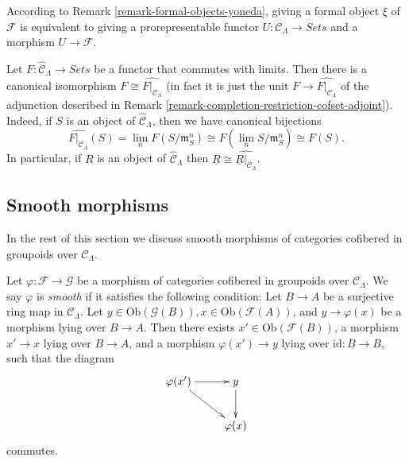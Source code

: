 \begin{remark}
\label{remark-spell-out-formal-object}
According to Remark \ref{remark-formal-objects-yoneda}, giving a formal object 
$\xi$ of $\mathcal{F}$ is equivalent to giving a prorepresentable functor $U: 
\mathcal{C}_\Lambda \to \textit{Sets}$ and a morphism $U 
\to \mathcal{F}$. 
\end{remark}

\begin{remark}
\label{remark-restrict-complete-continuous-functor}
Let $F : \widehat{\mathcal{C}}_\Lambda \to \textit{Sets}$ be a 
functor that commutes with limits.  Then there is a canonical isomorphism $F 
\cong \widehat{F|_{\mathcal{C}_\Lambda}}$ (in fact it is just the unit $F 
\to \widehat{F|_{\mathcal{C}_\Lambda}}$ of the adjunction described in 
Remark \ref{remark-completion-restriction-cofset-adjoint}).  Indeed, if $S$ is 
an object of $\widehat{\mathcal{C}}_\Lambda$, then we have canonical bijections
\[ \widehat{F|_{\mathcal{C}_\Lambda}}(S) = \lim_{n} F(S/\mathfrak{m}_{S}^n) 
\cong F(\lim_{n} S/\mathfrak{m}_{S}^n) \cong F(S). \]
In particular, if $R$ is an object of $\widehat{\mathcal{C}}_\Lambda$ then 
$\underline{R} \cong \widehat{\underline{R}|_{\mathcal{C}_\Lambda}}$.
\end{remark}




\subsection{Smooth morphisms}
\label{subsection-smooth-morphisms}

\noindent
In the rest of this section we discuss smooth morphisms of categories 
cofibered in groupoids over $\mathcal{C}_\Lambda$.

\begin{definition}
\label{definition-smooth-morphism}
Let $\varphi: \mathcal{F} \to \mathcal G$ be a morphism of categories 
cofibered in groupoids over $\mathcal{C}_\Lambda$.  We say  $\varphi$ is 
{\it smooth} if it satisfies the following condition: Let $B \to A$ be 
a surjective ring map in $\mathcal{C}_\Lambda$.  Let $y \in 
\text{Ob}(\mathcal G(B)), x \in \text{Ob}(\mathcal{F}(A))$, and $y 
\to \varphi(x)$ be a morphism lying over $B \to A$.  Then there 
exists $x' \in \text{Ob}(\mathcal{F}(B))$, a morphism $x' \to x$ 
lying over $B \to A$, and a morphism $\varphi(x') \to y$ lying 
over $\text{id}: B \to B$, such that the diagram
\[
\xymatrix{
\varphi(x') \ar[r] \ar[dr] & y \ar[d] \\
                        & \varphi(x)
}
\]
commutes.
\end{definition}

